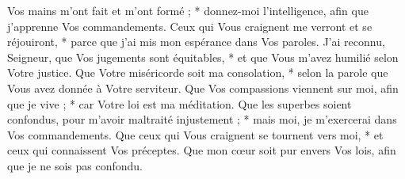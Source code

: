Vos mains m'ont fait et m'ont formé ; * donnez-moi l'intelligence, afin que j'apprenne Vos commandements.
\versseparator
Ceux qui Vous craignent me verront et se réjouiront, * parce que j'ai mis mon espérance dans Vos paroles.
\versseparator
J'ai reconnu, Seigneur, que Vos jugements sont équitables, * et que Vous m'avez humilié selon Votre justice.
\versseparator
Que Votre miséricorde soit ma consolation, * selon la parole que Vous avez donnée à Votre serviteur.
\versseparator
Que Vos compassions viennent sur moi, afin que je vive ; * car Votre loi est ma méditation.
\versseparator
Que les superbes soient confondus, pour m'avoir maltraité injustement ; * mais moi, je m'exercerai dans Vos commandements.
\versseparator
Que ceux qui Vous craignent se tournent vers moi, * et ceux qui connaissent Vos préceptes.
\versseparator
Que mon cœur soit pur envers Vos lois, afin que je ne sois pas confondu.